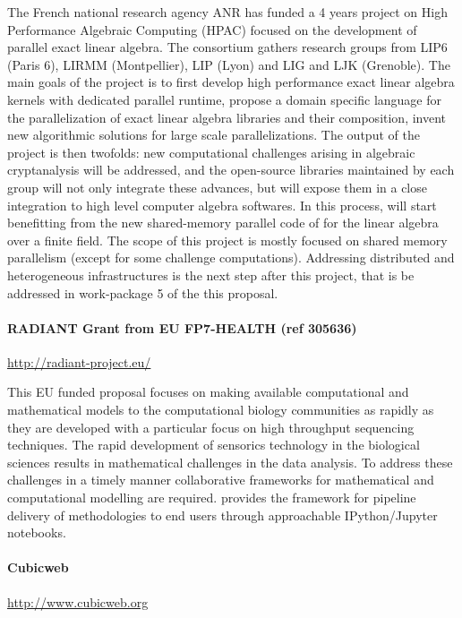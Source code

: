The French national research agency ANR has funded a 4 years project
on High Performance Algebraic Computing (HPAC) focused on the
development of parallel exact linear algebra. The consortium gathers
research groups from LIP6 (Paris 6), LIRMM (Montpellier), LIP (Lyon)
and LIG and LJK (Grenoble). The main goals of the project is to first
develop high performance exact linear algebra kernels with dedicated
parallel runtime, propose a domain specific language for the
parallelization of exact linear algebra libraries and their
composition, invent new algorithmic solutions for large scale
parallelizations. The output of the project is then twofolds: new
computational challenges arising in algebraic cryptanalysis will be
addressed, and the open-source libraries maintained by each group will
not only integrate these advances, but will expose them in a close
integration to high level computer algebra softwares. In this process,
\Sage will start benefitting from the new shared-memory parallel code
of \Linbox for the linear algebra over a finite field.  The scope of
this project is mostly focused on shared memory parallelism (except
for some challenge computations). Addressing distributed and
heterogeneous infrastructures is the next step after this project,
that is be addressed in work-package 5 of the this proposal.


\paragraph{RADIANT Grant from EU FP7-HEALTH (ref 305636)}
\url{http://radiant-project.eu/}

This EU funded proposal focuses on making available computational and
mathematical models to the computational biology communities as
rapidly as they are developed with a particular focus on high
throughput sequencing techniques. The rapid development of sensorics
technology in the biological sciences results in mathematical
challenges in the data analysis. To address these challenges in a
timely manner collaborative frameworks for mathematical and
computational modelling are required. \TheProject provides the
framework for pipeline delivery of methodologies to end users through
approachable IPython/Jupyter notebooks.


\paragraph{Cubicweb} \url{http://www.cubicweb.org}

